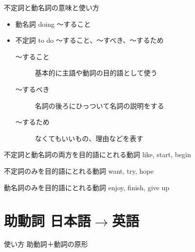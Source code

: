 \documentclass[10pt]{jsarticle}
\newcommand{\answer}[2]{{\color{orange}#2}}
\newcommand{\answer}[2]{\vspace{#1mm}}
\begin{document}
\begin{itembox}[l]{不定詞と動名詞の意味と使い方}
	\answer{8}{
		\begin{itemize}
			\item 動名詞 doing 〜すること
			\item 不定詞 to do 〜すること、〜すべき、〜するため
			      \begin{description}
				      \item[〜すること] 基本的に主語や動詞の目的語として使う
				      \item[〜するべき] 名詞の後ろにひっついて名詞の説明をする
				      \item[〜するため] なくてもいいもの、理由などを表す
			      \end{description}
		\end{itemize}
	}
\end{itembox}

\begin{itembox}[l]{不定詞と動名詞の両方を目的語にとれる動詞}
	\answer{8}{like, start, begin}
\end{itembox}

\begin{itembox}[l]{不定詞のみを目的語にとれる動詞}
	\answer{8}{want, try, hope}
\end{itembox}

\begin{itembox}[l]{動名詞のみを目的語にとれる動詞}
	\answer{8}{enjoy, finish, give up}
\end{itembox}

\newpage

\section{助動詞 日本語$\rightarrow$英語}

\begin{itembox}[l]{使い方}
	\answer{8}{助動詞＋動詞の原形}
\end{itembox}
\end{document}
